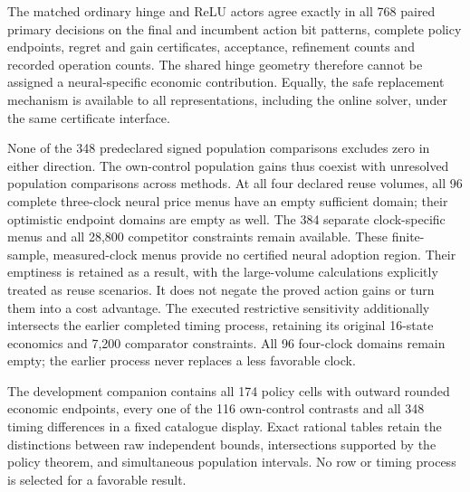 The matched ordinary hinge and ReLU actors agree exactly in all 768 paired
primary decisions on the final and incumbent action bit patterns, complete
policy endpoints, regret and gain certificates, acceptance, refinement
counts and recorded operation counts. The shared hinge geometry therefore
cannot be assigned a neural-specific economic contribution. Equally, the
safe replacement mechanism is available to all representations, including
the online solver, under the same certificate interface.

None of the 348 predeclared signed population comparisons excludes zero in
either direction. The own-control population gains thus coexist with
unresolved population comparisons across methods. At all four declared
reuse volumes, all 96 complete three-clock neural price menus have an empty
sufficient domain; their optimistic endpoint domains are empty as well.
The 384 separate clock-specific menus and all 28,800 competitor constraints
remain available. These finite-sample, measured-clock menus provide no
certified neural adoption region. Their emptiness is retained as a result,
with the large-volume calculations explicitly treated as reuse scenarios.
It does not negate the proved action gains or turn them into a cost advantage.
The executed restrictive sensitivity additionally intersects the earlier
completed timing process, retaining its original 16-state economics and
7,200 comparator constraints. All 96 four-clock domains remain empty;
the earlier process never replaces a less favorable clock.

The development companion contains all 174 policy cells with outward
rounded economic endpoints, every one of the 116 own-control contrasts and
all 348 timing differences in a fixed catalogue display. Exact rational
tables retain the distinctions between raw independent bounds, intersections
supported by the policy theorem, and simultaneous population intervals.
No row or timing process is selected for a favorable result.

